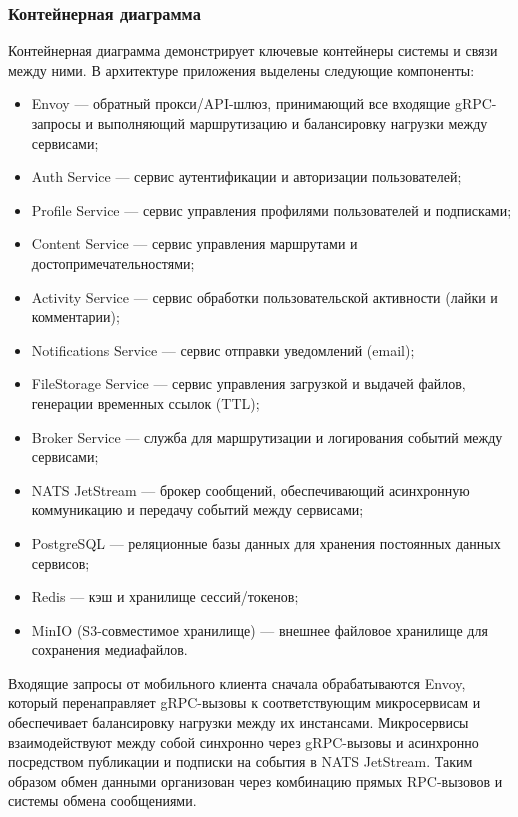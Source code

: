 \subsubsection*{Контейнерная диаграмма}
Контейнерная диаграмма демонстрирует ключевые контейнеры системы и связи между ними. В архитектуре приложения выделены следующие компоненты:
\begin{itemize}
    \item Envoy — обратный прокси/API-шлюз, принимающий все входящие gRPC-запросы и выполняющий маршрутизацию и балансировку нагрузки между сервисами;
    \item Auth Service — сервис аутентификации и авторизации пользователей;
    \item Profile Service — сервис управления профилями пользователей и подписками;
    \item Content Service — сервис управления маршрутами и достопримечательностями;
    \item Activity Service — сервис обработки пользовательской активности (лайки и комментарии);
    \item Notifications Service — сервис отправки уведомлений (email);
    \item FileStorage Service — сервис управления загрузкой и выдачей файлов, генерации временных ссылок (TTL);
    \item Broker Service — служба для маршрутизации и логирования событий между сервисами;
    \item NATS JetStream — брокер сообщений, обеспечивающий асинхронную коммуникацию и передачу событий между сервисами;
    \item PostgreSQL — реляционные базы данных для хранения постоянных данных сервисов;
    \item Redis — кэш и хранилище сессий/токенов;
    \item MinIO (S3-совместимое хранилище) — внешнее файловое хранилище для сохранения медиафайлов.
\end{itemize}
Входящие запросы от мобильного клиента сначала обрабатываются Envoy, который перенаправляет gRPC-вызовы к соответствующим микросервисам и обеспечивает балансировку нагрузки между их инстансами. Микросервисы взаимодействуют между собой синхронно через gRPC-вызовы и асинхронно посредством публикации и подписки на события в NATS JetStream. Таким образом обмен данными организован через комбинацию прямых RPC-вызовов и системы обмена сообщениями.
